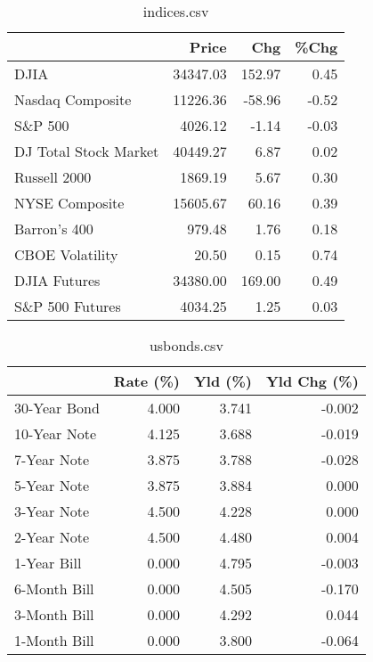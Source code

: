 \documentclass{article}%
\begin{document}
%


\begin{table}[htbp]%
\caption{indices.csv}%
\centering%
\begin{adjustbox}{width=1\textwidth}%
\begin{tabular}{lrrr}
\toprule
                      &    Price &    Chg &  \%Chg \\
\midrule
                 DJIA & 34347.03 & 152.97 &  0.45 \\
     Nasdaq Composite & 11226.36 & -58.96 & -0.52 \\
              S\&P 500 &  4026.12 &  -1.14 & -0.03 \\
DJ Total Stock Market & 40449.27 &   6.87 &  0.02 \\
         Russell 2000 &  1869.19 &   5.67 &  0.30 \\
       NYSE Composite & 15605.67 &  60.16 &  0.39 \\
         Barron's 400 &   979.48 &   1.76 &  0.18 \\
      CBOE Volatility &    20.50 &   0.15 &  0.74 \\
         DJIA Futures & 34380.00 & 169.00 &  0.49 \\
      S\&P 500 Futures &  4034.25 &   1.25 &  0.03 \\
\bottomrule
\end{tabular}
%
\end{adjustbox}%
\end{table}

%


\begin{table}[htbp]%
\caption{usbonds.csv}%
\centering%
\begin{adjustbox}{width=1\textwidth}%
\begin{tabular}{lrrr}
\toprule
             &  Rate (\%) &  Yld (\%) &  Yld Chg (\%) \\
\midrule
30-Year Bond &     4.000 &    3.741 &       -0.002 \\
10-Year Note &     4.125 &    3.688 &       -0.019 \\
 7-Year Note &     3.875 &    3.788 &       -0.028 \\
 5-Year Note &     3.875 &    3.884 &        0.000 \\
 3-Year Note &     4.500 &    4.228 &        0.000 \\
 2-Year Note &     4.500 &    4.480 &        0.004 \\
 1-Year Bill &     0.000 &    4.795 &       -0.003 \\
6-Month Bill &     0.000 &    4.505 &       -0.170 \\
3-Month Bill &     0.000 &    4.292 &        0.044 \\
1-Month Bill &     0.000 &    3.800 &       -0.064 \\
\bottomrule
\end{tabular}
%
\end{adjustbox}%
\end{table}
\end{document}

